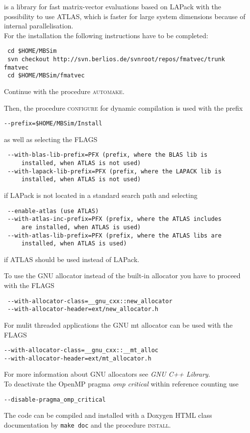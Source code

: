 \subsubsection{\FMatVec{}}
\FMatVec{} is a library for fast matrix-vector evaluations based on LAPack with the possibility to use ATLAS, which is faster for large system dimensions because of internal parallelisation.\\
For the installation the following instructions have to be completed:
\begin{verbatim}
 cd $HOME/MBSim
 svn checkout http://svn.berlios.de/svnroot/repos/fmatvec/trunk fmatvec
 cd $HOME/MBSim/fmatvec
\end{verbatim}
Continue with the procedure \textsc{automake}.\par
Then, the procedure \textsc{configure} for dynamic compilation is used with the prefix
\begin{verbatim}
--prefix=$HOME/MBSim/Install
\end{verbatim}
as well as selecting the FLAGS
\begin{verbatim}
 --with-blas-lib-prefix=PFX (prefix, where the BLAS lib is
     installed, when ATLAS is not used)
 --with-lapack-lib-prefix=PFX (prefix, where the LAPACK lib is
     installed, when ATLAS is not used)
\end{verbatim}
if LAPack is not located in a standard search path and selecting
\begin{verbatim}
 --enable-atlas (use ATLAS)
 --with-atlas-inc-prefix=PFX (prefix, where the ATLAS includes 
     are installed, when ATLAS is used)
 --with-atlas-lib-prefix=PFX (prefix, where the ATLAS libs are
     installed, when ATLAS is used)
\end{verbatim}
if ATLAS should be used instead of LAPack. \newline 

To use the GNU allocator instead of the \FMatVec{} built-in allocator you have to proceed with the FLAGS
\begin{verbatim}
 --with-allocator-class=__gnu_cxx::new_allocator
 --with-allocator-header=ext/new_allocator.h
\end{verbatim}
For mulit threaded applications the GNU mt allocator can be used with the FLAGS
\begin{verbatim}
--with-allocator-class=__gnu_cxx::__mt_alloc 
--with-allocator-header=ext/mt_allocator.h
\end{verbatim}
For more information about GNU allocators see \textit{GNU C++ Library}. \\
To deactivate the OpenMP pragma \textit{omp critical} within reference counting use
\begin{verbatim}
--disable-pragma_omp_critical
\end{verbatim}
The code can be compiled and installed with a Doxygen HTML class documentation by \texttt{make doc} and the procedure \textsc{install}.

